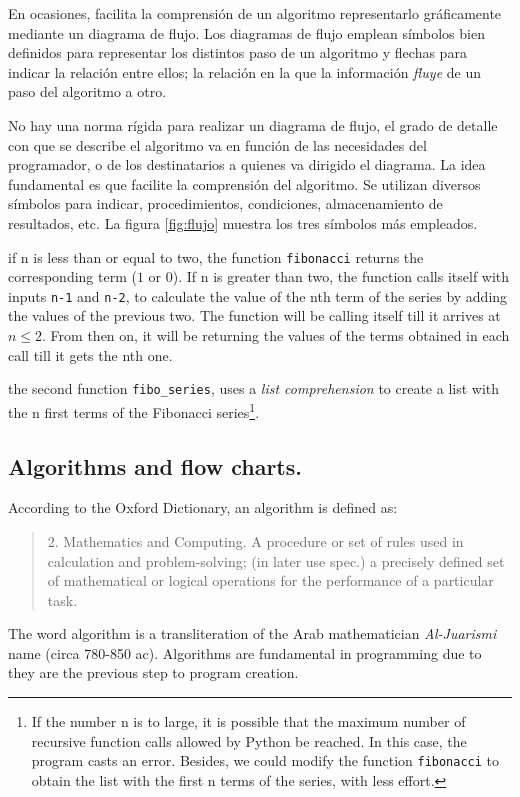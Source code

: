 \begin{paracol}{2}
En ocasiones, facilita la comprensión de un algoritmo representarlo gráficamente mediante un diagrama de flujo. Los diagramas de flujo emplean símbolos bien definidos para representar los distintos paso de un algoritmo y flechas para indicar la relación entre ellos; la relación en la que la información \emph{fluye} de un paso del algoritmo a otro.

No hay una norma rígida para realizar un diagrama de flujo, el grado de detalle con que se describe el algoritmo va en función de las necesidades del programador, o de los destinatarios a quienes va dirigido el diagrama. La idea fundamental es que facilite la comprensión del algoritmo. Se utilizan diversos símbolos para indicar, procedimientos, condiciones, almacenamiento de resultados, etc. La figura \ref{fig:flujo} muestra los tres símbolos más empleados.

\switchcolumn
if n is less than or equal to two, the function \texttt{fibonacci} returns the corresponding term ($1$ or $0$). If n is greater than two, the function calls itself with inputs \texttt{n-1} and \texttt{n-2}, to calculate the value of the nth term of the series by adding the values of the previous two. The function will be calling itself till it arrives at $n\leq 2$. From then on, it will be returning the values of the terms obtained in each call till it gets the nth one.

the second function \texttt{fibo_series}, uses a \emph{list comprehension} to create a list with the n first terms of the Fibonacci series\footnote{If the number n is to large, it is possible that the maximum number of recursive function calls allowed by Python be reached. In this case, the program casts an error. Besides, we could modify the function \texttt{fibonacci} to obtain the list with the first n terms of the series, with less effort.}.

\subsection{Algorithms and flow charts.}

According to the Oxford Dictionary, an algorithm is defined as:
\begin{quotation}
    2. Mathematics and Computing. A procedure or set of rules used in calculation and problem-solving; (in later use spec.) a precisely defined set of mathematical or logical operations for the performance of a particular task.
\end{quotation}
The word algorithm is a transliteration of the Arab mathematician \emph{Al-Juarismi} name (circa 780-850 ac). Algorithms are fundamental in programming due to they are the previous step to program creation. 


\end{paracol}
